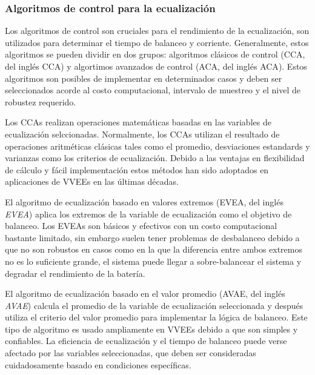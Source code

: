 \documentclass[10pt,a4paper]{article}
\newcounter{subsubsubsection}[subsubsection]
\begin{document}
\subsubsection{Algoritmos de control para la ecualizaci\'on}

Los algoritmos de control son cruciales para el rendimiento de la
ecualizaci\'on, son utilizados para determinar el tiempo de balanceo y
corriente. Generalmente, estos algoritmos se pueden dividir en dos grupos:
algoritmos cl\'asicos de control (\acrshort{CCA}, del ingl\'es \acrlong{CCA}) y
algortimos avanzados de control (\acrshort{ACA}, del ingl\'es \acrlong{ACA}).
Estos algoritmos son posibles de implementar en determinados casos y deben ser
seleccionados acorde al costo computacional, intervalo de muestreo y el nivel de
robustez requerido.


Los \acrshort{CCA}s realizan operaciones matem\'aticas basadas en las variables
de ecualizaci\'on selccionadas. Normalmente, los \acrshort{CCA}s utilizan el
resultado de operaciones aritm\'eticas cl\'asicas tales como el promedio,
desviaciones estandards y varianzas como los criterios de ecualizaci\'on. Debido
a las ventajas en flexibilidad de c\'alculo y f\'acil implementaci\'on estos
m\'etodos han sido adoptados en aplicaciones de \acrshort{VVEE}s en las
\'ultimas d\'ecadas.

El algoritmo de ecualizaci\'on basado en valores extremos (\acrshort{EVEA}, del
ingl\'es \emph{\acrlong{EVEA}}) aplica los extremos de la variable de ecualizaci\'on
como el objetivo de balanceo. Los \acrshort{EVEA}s son b\'asicos y efectivos con 
un costo computacional bastante limitado, sin embargo suelen tener problemas de
desbalanceo debido a que no son robustos en casos como en la que la diferencia
entre ambos extremos no es lo suficiente grande, el sistema puede llegar a
sobre-balancear el sistema y degradar el rendimiento de la bater\'ia.

El algoritmo de ecualizaci\'on basado en el valor promedio (\acrshort{AVAE}, del
ingl\'es \emph{\acrlong{AVAE}}) calcula el promedio de la variable de
ecualizaci\'on seleccionada y despu\'es utiliza el criterio del valor promedio
para implementar la l\'ogica de balanceo. Este tipo de algoritmo es usado
ampliamente en \acrshort{VVEE}s debido a que son simples y confiables. La
eficiencia de ecualizaci\'on y el tiempo de balanceo puede verse afectado por
las variables seleccionadas, que deben ser consideradas cuidadosamente basado en
condiciones espec\'ificas.
\end{document}
